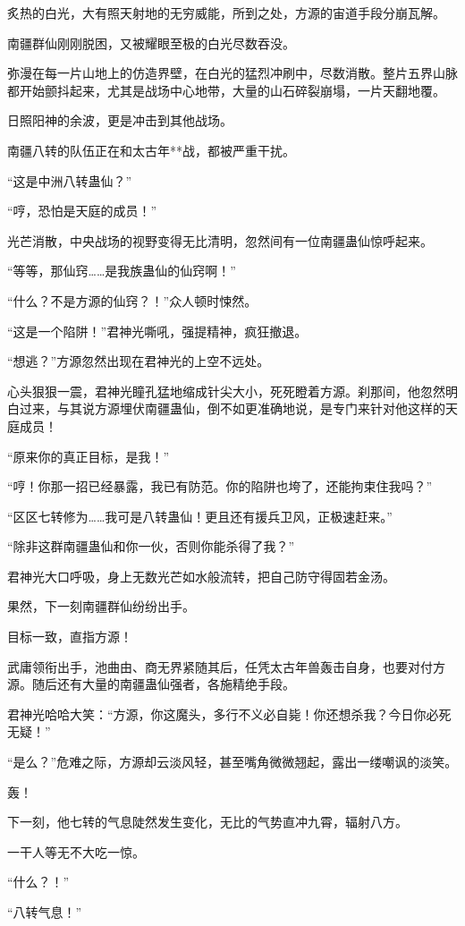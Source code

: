 \begin{this_body}
炙热的白光，大有照天射地的无穷威能，所到之处，方源的宙道手段分崩瓦解。

南疆群仙刚刚脱困，又被耀眼至极的白光尽数吞没。

弥漫在每一片山地上的仿造界壁，在白光的猛烈冲刷中，尽数消散。整片五界山脉都开始颤抖起来，尤其是战场中心地带，大量的山石碎裂崩塌，一片天翻地覆。

日照阳神的余波，更是冲击到其他战场。

南疆八转的队伍正在和太古年**战，都被严重干扰。

“这是中洲八转蛊仙？”

“哼，恐怕是天庭的成员！”

光芒消散，中央战场的视野变得无比清明，忽然间有一位南疆蛊仙惊呼起来。

“等等，那仙窍……是我族蛊仙的仙窍啊！”

“什么？不是方源的仙窍？！”众人顿时悚然。

“这是一个陷阱！”君神光嘶吼，强提精神，疯狂撤退。

“想逃？”方源忽然出现在君神光的上空不远处。

心头狠狠一震，君神光瞳孔猛地缩成针尖大小，死死瞪着方源。刹那间，他忽然明白过来，与其说方源埋伏南疆蛊仙，倒不如更准确地说，是专门来针对他这样的天庭成员！

“原来你的真正目标，是我！”

“哼！你那一招已经暴露，我已有防范。你的陷阱也垮了，还能拘束住我吗？”

“区区七转修为……我可是八转蛊仙！更且还有援兵卫风，正极速赶来。”

“除非这群南疆蛊仙和你一伙，否则你能杀得了我？”

君神光大口呼吸，身上无数光芒如水般流转，把自己防守得固若金汤。

果然，下一刻南疆群仙纷纷出手。

目标一致，直指方源！

武庸领衔出手，池曲由、商无界紧随其后，任凭太古年兽轰击自身，也要对付方源。随后还有大量的南疆蛊仙强者，各施精绝手段。

君神光哈哈大笑：“方源，你这魔头，多行不义必自毙！你还想杀我？今日你必死无疑！”

“是么？”危难之际，方源却云淡风轻，甚至嘴角微微翘起，露出一缕嘲讽的淡笑。

轰！

下一刻，他七转的气息陡然发生变化，无比的气势直冲九霄，辐射八方。

一干人等无不大吃一惊。

“什么？！”

“八转气息！”


\end{this_body}
